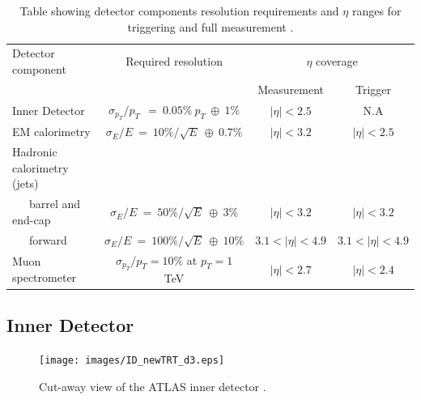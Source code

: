 	\begin {table}[h]
	\begin{center}
	\begin{tabular}{ | l | c | c | c | } 
		\hline
		Detector component & Required resolution & \multicolumn{2}{|c|}{$\eta$ coverage} \\
		 & & Measurement & Trigger \\
    	\hline\hline
    	Inner Detector & $\sigma_{p_{T}}/p_{T}~~=~0.05\%~p_{T}~\oplus~1\%$ & $|\eta|<2.5$ & N.A \\
    	\hline
    	EM calorimetry & $\sigma_{E}/E~=~10\%/\sqrt{E}~\oplus~0.7\%$ & $|\eta|<3.2$ & $|\eta|<2.5$ \\
    	\hline
    	Hadronic calorimetry (jets) &  &  &  \\
    	~~~barrel and end-cap & $\sigma_{E}/E~=~50\%/\sqrt{E}~\oplus~3\%$ & $|\eta|<3.2$ & $|\eta|<3.2$ \\
    	~~~forward  & $\sigma_{E}/E~=~100\%/\sqrt{E}~\oplus~10\%$ & $3.1<|\eta|<4.9$ & $3.1<|\eta|<4.9$ \\
    	\hline
    	Muon spectrometer & $\sigma_{p_{T}}/p_{T} =10\%$ at $p_{T} = 1$ TeV & $|\eta|<2.7$ & $|\eta|<2.4$ \\
    	\hline
  	\end{tabular}
  	\label{tab:det_res}
  	\caption{Table showing detector components resolution requirements and $\eta$ ranges for triggering and full measurement \cite{Aad:1129811}.}
  	\end{center}
	\end {table}




	\subsection{Inner Detector}

		\begin{figure}[h]
			\begin{center}
				\texttt{[image: images/ID\_newTRT\_d3.eps]}
			\end{center}
			\caption{Cut-away view of the ATLAS inner detector \cite{Aad:1129811}.}
			\label{fig:ATLAS_inner}
		\end{figure}

